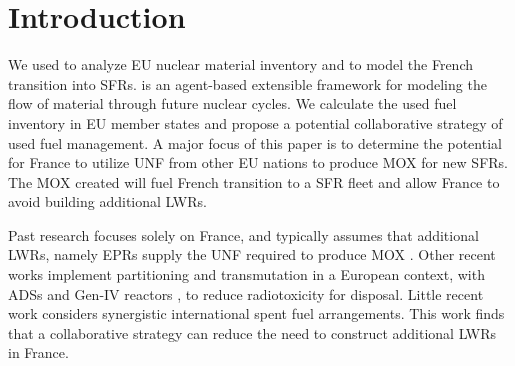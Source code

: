 
\section{Introduction}
We used \Cyclus \cite{huff_fundamental_2016} to analyze
 \gls{EU} nuclear material inventory and to model the French transition into
 \glspl{SFR}. \Cyclus is an agent-based extensible
framework for modeling the flow of material through future nuclear cycles.
We calculate the used fuel
inventory in \gls{EU} member states and propose a potential collaborative
strategy of used fuel management.
A major focus of this paper is to determine the potential for France to utilize
\gls{UNF} from other \gls{EU} nations to produce \gls{MOX} for new \glspl{SFR}.
The \gls{MOX} created will fuel French transition to a \gls{SFR} fleet
and allow France to avoid building additional \glspl{LWR}.

Past research focuses solely on France, and typically assumes that additional \glspl{LWR},
namely \glspl{EPR} supply the \gls{UNF} required to produce \gls{MOX} \cite{carre_overview_2009, martin_symbiotic_2017, freynet_multiobjective_2016}.
Other recent works implement partitioning and transmutation
in a European context, with \glspl{ADS} and Gen-IV reactors \cite{fazio_study_2013},
to reduce radiotoxicity for disposal.
Little recent work considers synergistic international spent fuel arrangements.
This work finds that a collaborative strategy can reduce the
need to construct additional \glspl{LWR} in France.
